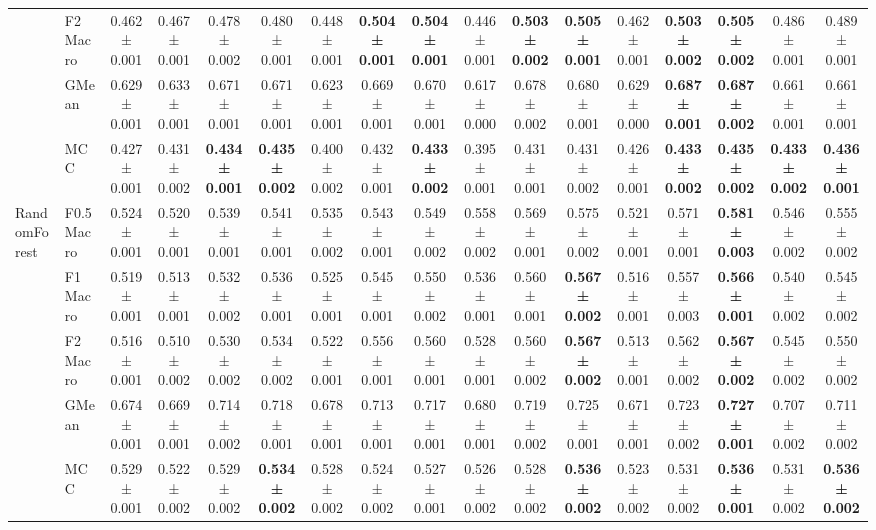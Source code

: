 \begin{table}[H]
{\begin{tabular}{llccccccccccccccc}
 & F2 Macro & 0.462 ± 0.001 & 0.467 ± 0.001 & 0.478 ± 0.002 & 0.480 ± 0.001 & 0.448 ± 0.001 & \textbf{0.504 ± 0.001} & \textbf{0.504 ± 0.001} & 0.446 ± 0.001 & \textbf{0.503 ± 0.002} & \textbf{0.505 ± 0.001} & 0.462 ± 0.001 & \textbf{0.503 ± 0.002} & \textbf{0.505 ± 0.002} & 0.486 ± 0.001 & 0.489 ± 0.001 \\
 & GMean & 0.629 ± 0.001 & 0.633 ± 0.001 & 0.671 ± 0.001 & 0.671 ± 0.001 & 0.623 ± 0.001 & 0.669 ± 0.001 & 0.670 ± 0.001 & 0.617 ± 0.000 & 0.678 ± 0.002 & 0.680 ± 0.001 & 0.629 ± 0.000 & \textbf{0.687 ± 0.001} & \textbf{0.687 ± 0.002} & 0.661 ± 0.001 & 0.661 ± 0.001 \\
 & MCC & 0.427 ± 0.001 & 0.431 ± 0.002 & \textbf{0.434 ± 0.001} & \textbf{0.435 ± 0.002} & 0.400 ± 0.002 & 0.432 ± 0.001 & \textbf{0.433 ± 0.002} & 0.395 ± 0.001 & 0.431 ± 0.001 & 0.431 ± 0.002 & 0.426 ± 0.001 & \textbf{0.433 ± 0.002} & \textbf{0.435 ± 0.002} & \textbf{0.433 ± 0.002} & \textbf{0.436 ± 0.001} \\
\cline{1-17}
\multirow[t]{5}{*}{RandomForest} & F0.5 Macro & 0.524 ± 0.001 & 0.520 ± 0.001 & 0.539 ± 0.001 & 0.541 ± 0.001 & 0.535 ± 0.002 & 0.543 ± 0.001 & 0.549 ± 0.002 & 0.558 ± 0.002 & 0.569 ± 0.001 & 0.575 ± 0.002 & 0.521 ± 0.001 & 0.571 ± 0.001 & \textbf{0.581 ± 0.003} & 0.546 ± 0.002 & 0.555 ± 0.002 \\
 & F1 Macro & 0.519 ± 0.001 & 0.513 ± 0.001 & 0.532 ± 0.002 & 0.536 ± 0.001 & 0.525 ± 0.001 & 0.545 ± 0.001 & 0.550 ± 0.002 & 0.536 ± 0.001 & 0.560 ± 0.001 & \textbf{0.567 ± 0.002} & 0.516 ± 0.001 & 0.557 ± 0.003 & \textbf{0.566 ± 0.001} & 0.540 ± 0.002 & 0.545 ± 0.002 \\
 & F2 Macro & 0.516 ± 0.001 & 0.510 ± 0.002 & 0.530 ± 0.002 & 0.534 ± 0.002 & 0.522 ± 0.001 & 0.556 ± 0.001 & 0.560 ± 0.001 & 0.528 ± 0.001 & 0.560 ± 0.002 & \textbf{0.567 ± 0.002} & 0.513 ± 0.001 & 0.562 ± 0.002 & \textbf{0.567 ± 0.002} & 0.545 ± 0.002 & 0.550 ± 0.002 \\
 & GMean & 0.674 ± 0.001 & 0.669 ± 0.001 & 0.714 ± 0.002 & 0.718 ± 0.001 & 0.678 ± 0.001 & 0.713 ± 0.001 & 0.717 ± 0.001 & 0.680 ± 0.001 & 0.719 ± 0.002 & 0.725 ± 0.001 & 0.671 ± 0.001 & 0.723 ± 0.002 & \textbf{0.727 ± 0.001} & 0.707 ± 0.002 & 0.711 ± 0.002 \\
 & MCC & 0.529 ± 0.001 & 0.522 ± 0.002 & 0.529 ± 0.002 & \textbf{0.534 ± 0.002} & 0.528 ± 0.002 & 0.524 ± 0.002 & 0.527 ± 0.001 & 0.526 ± 0.002 & 0.528 ± 0.002 & \textbf{0.536 ± 0.002} & 0.523 ± 0.002 & 0.531 ± 0.002 & \textbf{0.536 ± 0.001} & 0.531 ± 0.002 & \textbf{0.536 ± 0.002} \\

\end{tabular}}
\end{table}
